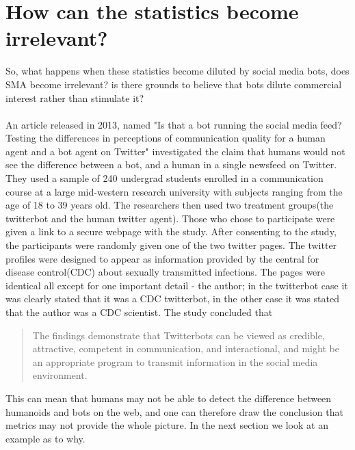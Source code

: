 \section{How can the statistics become irrelevant?}
So, what happens when these statistics become diluted by social media bots, does SMA become irrelevant? is there grounds to believe that bots dilute commercial interest rather than stimulate it? 
\\
\\
An article released in 2013, named "Is that a bot running the social media feed? Testing the differences in perceptions of communication quality for a human agent and a bot agent on Twitter"\cite{Edwards2014372} investigated the claim that humans would not see the difference between a bot, and a human in a single newsfeed on Twitter. They used a sample of 240 undergrad students enrolled in a communication course at a large mid-western research university with subjects ranging from the age of 18 to 39 years old. The researchers then used two treatment groups(the twitterbot and the human twitter agent). Those who chose to participate were given a link to a secure webpage with the study. After consenting to the study, the participants were randomly given one of the two twitter pages. The twitter profiles were designed to appear as information provided by the central for disease control(CDC) about sexually transmitted infections. The pages were identical all except for one important detail - the author; in the twitterbot case it was clearly stated that it was a CDC twitterbot, in the other case it was stated that the author was a CDC scientist. The study concluded that
 \begin{quote}
The findings demonstrate that Twitterbots can be viewed as credible, attractive,
competent in communication, and interactional, and might be an
appropriate program to transmit information in the social media
environment. 
\newline \mbox{} \hfill \citet{Edwards2014372}

\end{quote}
This can mean that humans may not be able to detect the difference between humanoids and bots on the web, and one can therefore draw the conclusion that metrics may not provide the whole picture. In the next section we look at an example as to why. 









